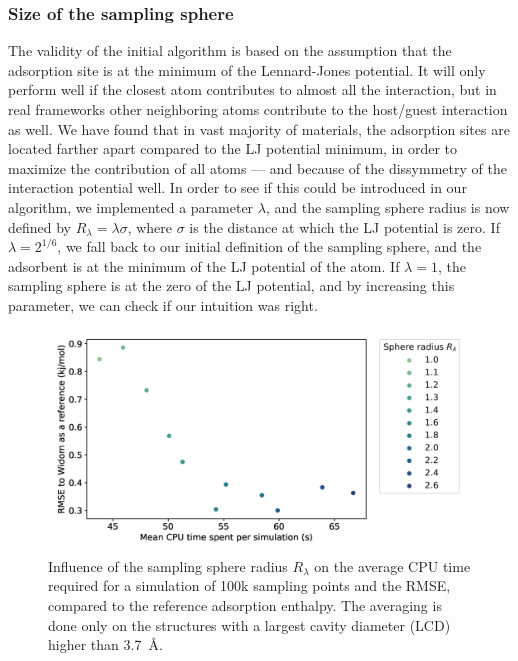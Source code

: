 \documentclass[main]{subfiles}
\begin{document}
\subsubsection{Size of the sampling sphere}

The validity of the initial algorithm is based on the assumption that the adsorption site is at the minimum of the Lennard-Jones potential. It will only perform well if the closest atom contributes to almost all the interaction, but in real frameworks other neighboring atoms contribute to the host/guest interaction as well. We have found that in vast majority of materials, the adsorption sites are located farther apart compared to the LJ potential minimum, in order to maximize the contribution of all atoms --- and because of the dissymmetry of the interaction potential well. In order to see if this could be introduced in our algorithm, we implemented a parameter $\lambda$, and the sampling sphere radius is now defined by $R_{\lambda} = \lambda \sigma$, where $\sigma$ is the distance at which the LJ potential is zero. If $\lambda=2^{1/6}$, we fall back to our initial definition of the sampling sphere, and the adsorbent is at the minimum of the LJ potential of the atom. If $\lambda=1$, the sampling sphere is at the zero of the LJ potential, and by increasing this parameter, we can check if our intuition was right.

\begin{figure}[ht]
\centering
  \includegraphics[width=0.7\linewidth]{figures/3-fastsim/sphere_size_optimisation.png}
  \caption{Influence of the sampling sphere radius $R_{\lambda}$ on the average CPU time required for a simulation of 100k sampling points and the RMSE, compared to the reference adsorption enthalpy. The averaging is done only on the structures with a largest cavity diameter (LCD) higher than \SI{3.7}{\angstrom}.}
  \label{fgr:radius}
\end{figure}
\end{document}
